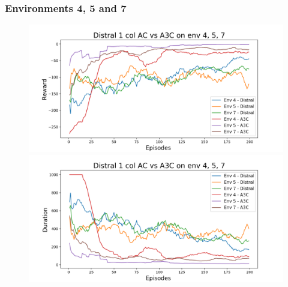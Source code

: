 \documentclass[12pt]{report}
\begin{document}
\subsubsection{Environments 4, 5 and 7}
\begin{figure}[H]
\centering
\begin{minipage}{.5\textwidth}
\centering
\includegraphics[width=\textwidth]{figs/d1_col_ac/d1_col_ac_4_5_7_rwd.png}
\end{minipage}%
\centering
\begin{minipage}{.5\textwidth}
\centering
\includegraphics[width=\textwidth]{figs/d1_col_ac/d1_col_ac_4_5_7_dur.png}
\end{minipage}%
\end{figure}
\end{document}
